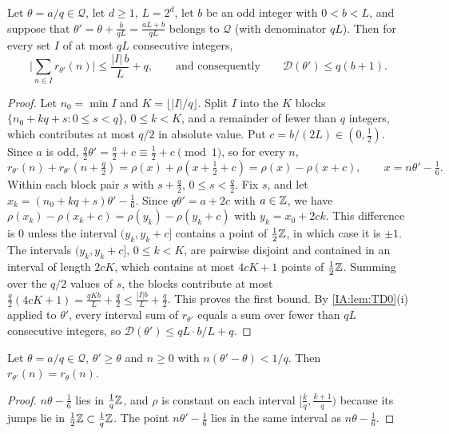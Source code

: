 \begin{lemma}\label{IA:lem:TD1}
Let $\theta=a/q\in\mathcal Q$, let $d\ge1$, $L=2^d$, let $b$ be an odd integer with $0<b<L$, and
suppose that $\theta'=\theta+\frac{b}{qL}=\frac{aL+b}{qL}$ belongs to $\mathcal Q$ (with denominator
$qL$). Then for every set $I$ of at most $qL$ consecutive integers,
\[
\Big|\sum_{n\in I}r_{\theta'}(n)\Big|\le\frac{|I|\,b}{L}+q,\qquad\text{and consequently}\qquad
\mathcal D(\theta')\le q(b+1).
\]
\end{lemma}

\begin{proof}
Let $n_0=\min I$ and $K=\lfloor|I|/q\rfloor$. Split $I$ into the $K$ blocks
$\{n_0+kq+s:0\le s<q\}$, $0\le k<K$, and a remainder of fewer than $q$ integers, which contributes at
most $q/2$ in absolute value. Put $c=b/(2L)\in(0,\frac12)$. Since $a$ is odd,
$\frac q2\theta'=\frac a2+c\equiv\frac12+c\pmod1$, so for every $n$,
\[
r_{\theta'}(n)+r_{\theta'}(n+\tfrac q2)=\rho(x)+\rho(x+\tfrac12+c)=\rho(x)-\rho(x+c),\qquad
x=n\theta'-\tfrac16 .
\]
Within each block pair $s$ with $s+\frac q2$, $0\le s<\frac q2$. Fix $s$, and let
$x_k=(n_0+kq+s)\theta'-\frac16$. Since $q\theta'=a+2c$ with $a\in\mathbb{Z}$, we have
$\rho(x_k)-\rho(x_k+c)=\rho(y_k)-\rho(y_k+c)$ with $y_k=x_0+2ck$. This difference is $0$ unless the
interval $(y_k,y_k+c]$ contains a point of $\frac12\mathbb{Z}$, in which case it is $\pm1$. The intervals
$(y_k,y_k+c]$, $0\le k<K$, are pairwise disjoint and contained in an interval of length $2cK$, which
contains at most $4cK+1$ points of $\frac12\mathbb{Z}$. Summing over the $q/2$ values of $s$, the blocks
contribute at most $\frac q2(4cK+1)=\frac{qKb}{L}+\frac q2\le\frac{|I|b}{L}+\frac q2$. This proves
the first bound. By \cref{IA:lem:TD0}(i) applied to $\theta'$, every interval sum of $r_{\theta'}$
equals a sum over fewer than $qL$ consecutive integers, so $\mathcal D(\theta')\le qL\cdot b/L+q$.
\end{proof}

\begin{lemma}\label{IA:lem:TD2}
Let $\theta=a/q\in\mathcal Q$, $\theta'\ge\theta$ and $n\ge0$ with $n(\theta'-\theta)<1/q$. Then
$r_{\theta'}(n)=r_\theta(n)$.
\end{lemma}

\begin{proof}
$n\theta-\frac16$ lies in $\frac1q\mathbb{Z}$, and $\rho$ is constant on each interval
$[\frac kq,\frac{k+1}q)$ because its jumps lie in $\frac12\mathbb{Z}\subset\frac1q\mathbb{Z}$. The point
$n\theta'-\frac16$ lies in the same interval as $n\theta-\frac16$.
\end{proof}

